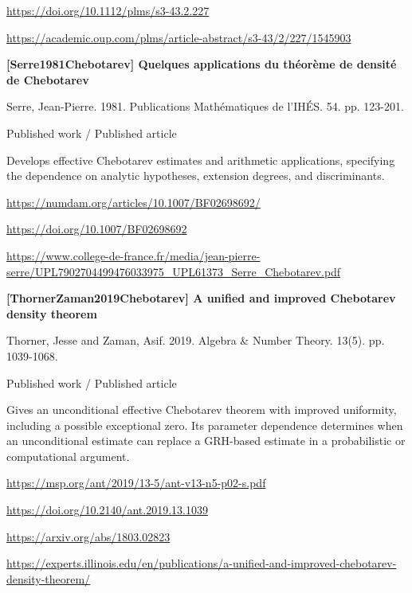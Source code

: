 \documentclass[11pt,a4paper,oneside,openany]{book}
\begin{document}
{\footnotesize\url{https://doi.org/10.1112/plms/s3-43.2.227}}\par
{\footnotesize\url{https://academic.oup.com/plms/article-abstract/s3-43/2/227/1545903}}\par
\vspace{9pt}
\hypertarget{ref:Serre1981Chebotarev}{}
{\sffamily\bfseries\color{atlasgreen}[Serre1981Chebotarev] Quelques applications du théorème de densité de Chebotarev}\par
\color{black} Serre, Jean-Pierre. 1981. Publications Mathématiques de l'IHÉS. 54. pp. 123-201.\par
{\small\sffamily\color{atlasgold}Published work / Published article}\par
\color{black} Develops effective Chebotarev estimates and arithmetic applications, specifying the dependence on analytic hypotheses, extension degrees, and discriminants.\par
{\footnotesize\url{https://numdam.org/articles/10.1007/BF02698692/}}\par
{\footnotesize\url{https://doi.org/10.1007/BF02698692}}\par
{\footnotesize\url{https://www.college-de-france.fr/media/jean-pierre-serre/UPL7902704499476033975_UPL61373_Serre_Chebotarev.pdf}}\par
\vspace{9pt}
\hypertarget{ref:ThornerZaman2019Chebotarev}{}
{\sffamily\bfseries\color{atlasgreen}[ThornerZaman2019Chebotarev] A unified and improved Chebotarev density theorem}\par
\color{black} Thorner, Jesse and Zaman, Asif. 2019. Algebra \& Number Theory. 13(5). pp. 1039-1068.\par
{\small\sffamily\color{atlasgold}Published work / Published article}\par
\color{black} Gives an unconditional effective Chebotarev theorem with improved uniformity, including a possible exceptional zero. Its parameter dependence determines when an unconditional estimate can replace a GRH-based estimate in a probabilistic or computational argument.\par
{\footnotesize\url{https://msp.org/ant/2019/13-5/ant-v13-n5-p02-s.pdf}}\par
{\footnotesize\url{https://doi.org/10.2140/ant.2019.13.1039}}\par
{\footnotesize\url{https://arxiv.org/abs/1803.02823}}\par
{\footnotesize\url{https://experts.illinois.edu/en/publications/a-unified-and-improved-chebotarev-density-theorem/}}\par
\end{document}
